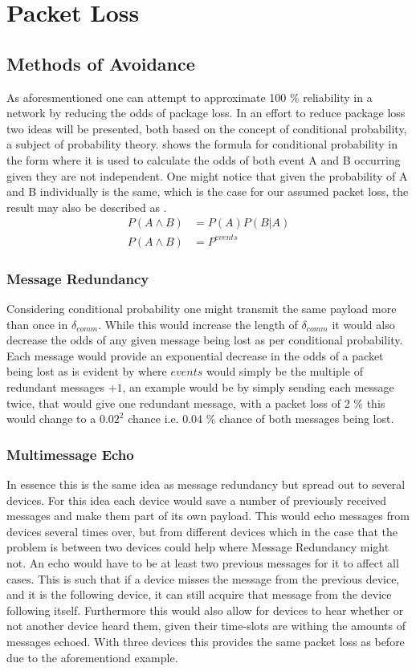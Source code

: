\section{Packet Loss}
\subsection{Methods of Avoidance}
As aforesmentioned one can attempt to approximate 100 \% reliability in a network by reducing the odds of package loss.
In an effort to reduce package loss two ideas will be presented, both based on the concept of conditional probability, a subject of probability theory.
 shows the formula for conditional probability in the form where it is used to calculate the odds of both event A and B occurring given they are not independent.
One might notice that given the probability of A and B individually is the same, which is the case for our assumed packet loss, the result may also be described as .
\begin{align}
P(A \land B) &= P(A)P(B|A) \label{eq:conditionalProb} \\  
P(A \land B) &= P^{events} \label{eq:conditionalProb2}
\end{align}

\subsubsection*{Message Redundancy}\label{redundancy}
Considering conditional probability one might transmit the same payload more than once in $\delta_{comm}$.
While this would increase the length of $\delta_{comm}$ it would also decrease the odds of any given message being lost as per conditional probability.
Each message would provide an exponential decrease in the odds of a packet being lost as is evident by  where $events$ would simply be the multiple of redundant messages $+ 1$, an example would be by simply sending each message twice, that would give one redundant message, with a packet loss of 2 \% this would change to a $0.02^2$ chance i.e. 0.04 \% chance of both messages being lost.

\subsubsection*{Multimessage Echo}
In essence this is the same idea as message redundancy but spread out to several devices.
For this idea each device would save a number of previously received messages and make them part of its own payload.
This would echo messages from devices several times over, but from different devices which in the case that the problem is between two devices could help where Message Redundancy might not.
An echo would have to be at least two previous messages for it to affect all cases.
This is such that if a device misses the message from the previous device, and it is the following device, it can still acquire that message from the device following itself.
Furthermore this would also allow for devices to hear whether or not another device heard them, given their time-slots are withing the amounts of messages echoed.
With three devices this provides the same packet loss as before due to the aforementiond example.